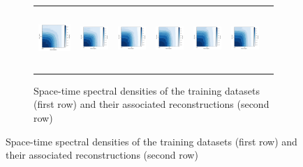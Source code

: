 \documentclass[draft]{agujournal2019}
\begin{document}
\begin{figure}[h]
\begin{minipage}{.80\linewidth}
\begin{subfigure}[t]{.9\linewidth}
\begin{center}
\begin{tabular}{ccccccc}
\hspace{0cm}\includegraphics[trim={0mm 0 22mm 5mm},clip, width=2.3cm,height=2.3cm]{figures/plots/orca025_rec_psd_spacetime.png} &
\includegraphics[trim={13mm 0 22mm 5mm},clip, width=2cm,height=2.3cm]{figures/plots/glorys12-f_rec_psd_spacetime.png}&
\includegraphics[trim={13mm 0 22mm 5mm},clip, width=2cm,height=2.3cm]{figures/plots/glorys12-r_rec_psd_spacetime.png}&
\includegraphics[trim={13mm 0 22mm 5mm},clip, width=2cm,height=2.3cm]{figures/plots/natl60_rec_psd_spacetime.png}&
\includegraphics[trim={13mm 0 22mm 5mm},clip, width=2cm,height=2.3cm]{figures/plots/enatl60-t_rec_psd_spacetime.png} &
\includegraphics[trim={13mm 0 22mm 5mm},clip, width=2cm,height=2.3cm]{figures/plots/enatl60-0_rec_psd_spacetime.png}  &
\\

\end{tabular}
\caption{
Space-time spectral densities of the training datasets (first row) and their associated reconstructions (second row)} \vspace{-5mm}
\label{fig:spacetime_psd}
\end{center}


\end{subfigure}
\end{minipage}
\end{figure}
\end{document}
